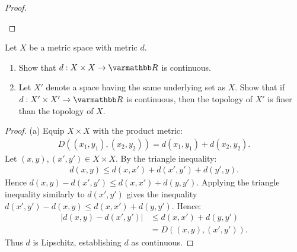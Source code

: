 \documentclass[12pt,twoside,openany]{memoir}
\begin{document}
{\begin{proof}
\begin{center}
            \end{center}
    \end{proof}}
\begin{exercise}[manual-num={3}]
Let $X$ be a metric space with metric $d$.
\begin{enumerate}[label = (\alph*),itemsep=1pt,topsep=3pt]
    \item Show that $d:X \times X \rightarrow \bfR$ is continuous.
    \item Let $X'$ denote a space having the same underlying set as $X$. Show that if $d:X' \times X' \rightarrow \bfR$ is continuous, then the topology of $X'$ is finer than the topology of $X$.
\end{enumerate}
\end{exercise}
    {\color{blue} \begin{proof}
        (a) Equip $X \times X$ with the product metric:
            \begin{equation*}
            \begin{split}
                D((x_1,y_1),(x_2,y_2)) = d(x_1,y_1) + d(x_2,y_2).
            \end{split}
            \end{equation*}
        Let $(x,y), (x',y') \in X \times X$. By the triangle inequality:
            \begin{equation*}
            \begin{split}
                d(x,y) \leq d(x,x') + d(x',y') + d(y',y).
            \end{split}
            \end{equation*}
        Hence $d(x,y) - d(x',y') \leq d(x,x') + d(y,y')$. Applying the triangle inequality similarly to $d(x',y')$ gives the inequality $d(x',y') - d(x,y) \leq d(x,x') + d(y,y')$. Hence:
            \begin{equation*}
            \begin{split}
                |d(x,y) - d(x',y')| 
                & \leq d(x,x') + d(y,y') \\
                & = D((x,y),(x',y')).
            \end{split}
            \end{equation*}
        Thus $d$ is Lipschitz, establishing $d$ as continuous.
    \end{proof}}
\end{document}
